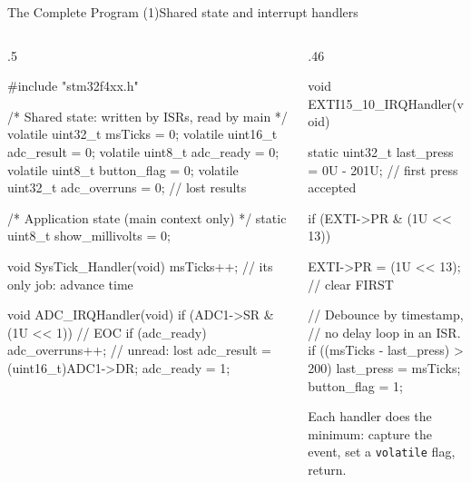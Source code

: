 \documentclass[9pt,aspectratio=169,xcolor=table]{beamer}
\begin{document}
\begin{frame}[fragile]{The Complete Program (1)}{Shared state and interrupt handlers}
    \begin{columns}[T]
    \begin{column}{.5\textwidth}
\begin{cc}[basicstyle=\ttfamily\scriptsize]
#include "stm32f4xx.h"

/* Shared state: written by ISRs, read by main */
volatile uint32_t msTicks     = 0;
volatile uint16_t adc_result  = 0;
volatile uint8_t  adc_ready   = 0;
volatile uint8_t  button_flag = 0;
volatile uint32_t adc_overruns = 0;  // lost results

/* Application state (main context only) */
static uint8_t show_millivolts = 0;

void SysTick_Handler(void) {
    msTicks++;      // its only job: advance time
}

void ADC_IRQHandler(void) {
    if (ADC1->SR & (1U << 1)) {   // EOC
        if (adc_ready) adc_overruns++; // unread: lost
        adc_result = (uint16_t)ADC1->DR;
        adc_ready  = 1;
    }
}
\end{cc}
    \end{column}
    \begin{column}{.46\textwidth}
\begin{cc}[basicstyle=\ttfamily\scriptsize]
void EXTI15_10_IRQHandler(void) {
    static uint32_t last_press = 0U - 201U;
                    // first press accepted

    if (EXTI->PR & (1U << 13)) {
        EXTI->PR = (1U << 13);  // clear FIRST

        // Debounce by timestamp,
        // no delay loop in an ISR.
        if ((msTicks - last_press) > 200) {
            last_press  = msTicks;
            button_flag = 1;
        }
    }
}
\end{cc}
        \vspace{1mm}
        {\small Each handler does the \alert{minimum}: capture the event, set a \texttt{volatile} flag, return.}
    \end{column}
    \end{columns}
\end{frame}
\end{document}
